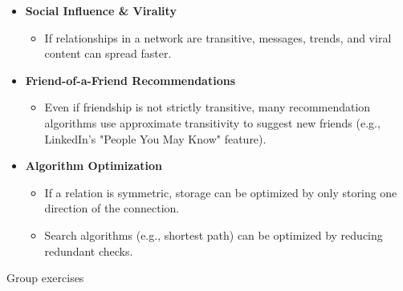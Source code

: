 \documentclass[10pt]{beamer}
\begin{document}
\begin{frame}

\begin{mygreenbox}[title=Why do relations matter?: Some examples from social networks]

\begin{itemize}
\item \textbf{Social Influence \& Virality}

\begin{itemize}
\item If relationships in a network are \alert{transitive}, messages, trends, and viral content can spread faster.
\end{itemize}

\item \textbf{Friend-of-a-Friend Recommendations}  
\begin{itemize}
\item Even if friendship is not strictly \alert{transitive}, many recommendation algorithms use approximate transitivity to suggest new friends (e.g., LinkedIn’s "People You May Know" feature).
\end{itemize}


\item \textbf{Algorithm Optimization}
\begin{itemize}
\item If a relation is \alert{symmetric}, storage can be optimized by only storing one direction of the connection.
\item Search algorithms (e.g., shortest path) can be optimized by reducing redundant checks.
\end{itemize}
\end{itemize}
\end{mygreenbox}

\end{frame}

\begin{frame}[standout]
Group exercises
\end{frame}
\end{document}
